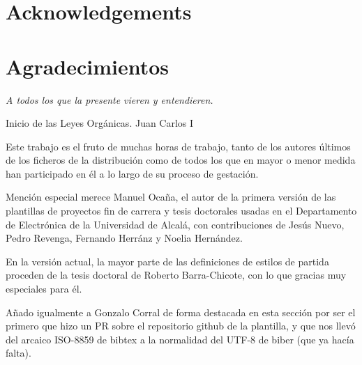 \documentclass[spanish,openright]{book}
\newenvironment{FraseCelebre}{\begin{list}{}{\setlength{\leftmargin}{0.5\textwidth}\setlength{\parsep}{0cm}\addtolength{\topsep}{0.5cm}}
}
{\unskip \end{list}}
\newenvironment{Frase}{\item \begin{flushright}\small\em}{\end{flushright}}
\newenvironment{Fuente}{\item \begin{flushright}\small}{\end{flushright}}
\newcommand{\myLanguage}{english}
\begin{document}
\vspace{4cm}
\vspace*{\fill}







\thispagestyle{empty}

\ifthenelse{\equal{\myLanguage}{english}}
{
\chapter*{Acknowledgements}
\label{cha:acknowledgements}
}
{
\chapter*{Agradecimientos}
\label{cha:agradecimientos}
}




\begin{FraseCelebre}
\begin{Frase}
A todos los que la presente vieren y entendieren.
\end{Frase}
\begin{Fuente}
Inicio de las Leyes Orgánicas. Juan Carlos I
\end{Fuente}
\end{FraseCelebre}




Este trabajo es el fruto de muchas horas de trabajo, tanto de los
autores últimos de los ficheros de la distribución como de todos los que
en mayor o menor medida han participado en él a lo largo de su proceso
de gestación.

Mención especial merece Manuel Ocaña, el autor de la primera versión de
las plantillas de proyectos fin de carrera y tesis doctorales usadas en
el Departamento de Electrónica de la Universidad de Alcalá, con
contribuciones de Jesús Nuevo, Pedro Revenga, Fernando Herránz y Noelia
Hernández.

En la versión actual, la mayor parte de las definiciones de estilos de
partida proceden de la tesis doctoral de Roberto Barra-Chicote, con lo
que gracias muy especiales para él.

Añado igualmente a Gonzalo Corral de forma destacada en esta sección por ser el
primero que hizo un PR sobre el repositorio github de la plantilla, y que nos
llevó del arcaico ISO-8859 de bibtex a la normalidad del UTF-8 de biber (que ya
hacía falta).
\end{document}
